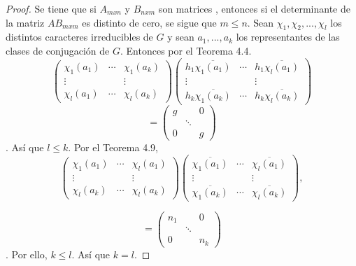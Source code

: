 \documentclass[12pt]{book}
\theoremstyle{definition}
\newcounter{in}
\begin{document}
\begin{proof}
  Se tiene que si $A_{mxn}$ y $B_{nxm}$ son matrices , entonces si el
  determinante de la matriz $AB_{mxm}$ es distinto de cero, se sigue que $m \leq n$.
  Sean $\chi_{1}, \chi_{2},...,\chi_{l}$ los distintos caracteres irreducibles de $G$ y sean $a_{1},...,a_{k}$ los representantes de las clases de conjugación de $G$. Entonces por el Teorema 4.4.
\begin{equation*}
  \begin{pmatrix}
    \chi_{1}(a_{1}) & \cdots & \chi_{1}(a_{k}) \\ 
    \vdots &  & \vdots \\
    \chi_{l}(a_{1}) & \cdots & \chi_{l}(a_{k})
  \end{pmatrix}
  \begin{pmatrix}
    h_{1} \overline{\chi_{1}(a_{1})} & \cdots & h_{1} \overline{\chi_{l}(a_{1})} \\ 
    \vdots &  & \vdots \\
    h_{k} \overline{\chi_{1}(a_{k})} & \cdots & h_{k} \overline{\chi_{l}(a_{k})}  
  \end{pmatrix}
\end{equation*}
\begin{equation*}
  =
  \begin{pmatrix}
   g & & 0\\ 
     & \ddots & \\
     0 &  & g
  \end{pmatrix}   
  \end{equation*}.
  Así que $l \leq k$. Por el Teorema 4.9,
\begin{equation*}
  \begin{pmatrix}
    \chi_{1}(a_{1}) & \cdots & \chi_{l}(a_{1}) \\ 
    \vdots &  & \vdots \\
    \chi_{l}(a_{k}) & \cdots & \chi_{l}(a_{k})
  \end{pmatrix}
  \begin{pmatrix}
     \overline{\chi_{1}(a_{1})} & \cdots &  \overline{\chi_{l}(a_{1})} \\ 
    \vdots &  & \vdots \\
     \overline{\chi_{1}(a_{k})} & \cdots &  \overline{\chi_{l}(a_{k})}  
  \end{pmatrix},
\end{equation*}

\begin{equation*}
  =
  \begin{pmatrix}
   n_{1} & & 0\\ 
     & \ddots & \\
     0 &  & n_{k}
  \end{pmatrix}
\end{equation*}.
Por ello, $k \leq l$. Así que $k=l$.
\end{proof}
\end{document}
